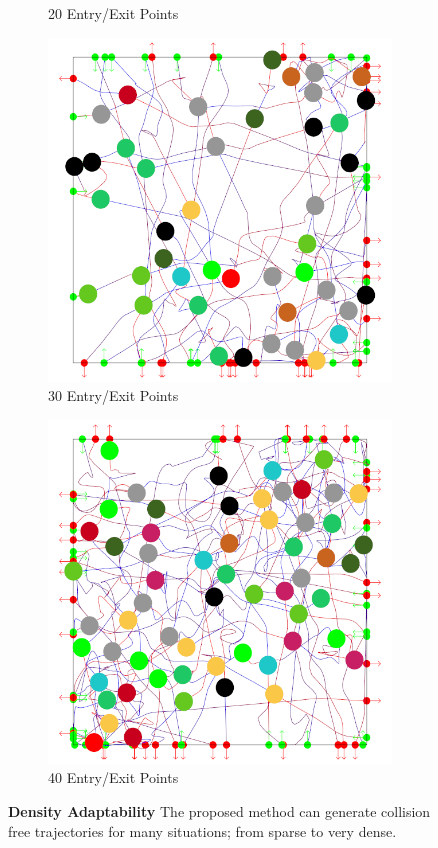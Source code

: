 \begin{figure}[t]
\begin{subfigure}[b]{0.24\linewidth}
		\caption{20 Entry/Exit Points}
	 \end{subfigure}
	 \begin{subfigure}[b]{0.24\linewidth}
		\includegraphics[width=\linewidth]{images/res-30-entry-exit.png}
		\caption{30 Entry/Exit Points}
	 \end{subfigure}
	 \begin{subfigure}[b]{0.24\linewidth}
		\includegraphics[width=\linewidth]{images/res-40-entry-exit.png}
		\caption{40 Entry/Exit Points}
	 \end{subfigure}
	\caption{\textbf{Density Adaptability}
			The proposed method can generate collision free trajectories for many situations; from sparse to very dense.
			}
	\label{fig:res:inputs}
\end{figure}
